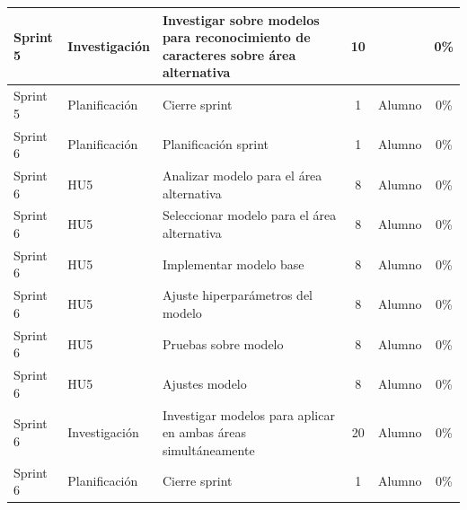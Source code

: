 \documentclass[
11pt, %
]{charter}
\begin{document}
\begin{table}[htpb]
\begin{tabularx}{\linewidth}{@{}|l|l|X|c|l|c|@{}}
Sprint 5	&	Investigación	&	Investigar sobre modelos para reconocimiento de caracteres sobre área alternativa	&	10	&		&	0\%	\\ \hline
Sprint 5	&	Planificación	&	Cierre sprint	&	1	&	Alumno	&	0\%	\\ \hline
Sprint 6	&	Planificación	&	Planificación sprint	&	1	&	Alumno	&	0\%	\\ \hline
Sprint 6	&	HU5	&	Analizar modelo para el área alternativa	&	8	&	Alumno	&	0\%	\\ \hline
Sprint 6	&	HU5	&	Seleccionar modelo para el área alternativa	&	8	&	Alumno	&	0\%	\\ \hline
Sprint 6	&	HU5	&	Implementar modelo base	&	8	&	Alumno	&	0\%	\\ \hline
Sprint 6	&	HU5	&	Ajuste hiperparámetros del modelo	&	8	&	Alumno	&	0\%	\\ \hline
Sprint 6	&	HU5	&	Pruebas sobre modelo	&	8	&	Alumno	&	0\%	\\ \hline
Sprint 6	&	HU5	&	Ajustes modelo	&	8	&	Alumno	&	0\%	\\ \hline
Sprint 6	&	Investigación	&	Investigar modelos  para aplicar en ambas áreas simultáneamente	&	20	&	Alumno	&	0\%	\\ \hline
Sprint 6	&	Planificación	&	Cierre sprint	&	1	&	Alumno	&	0\%	\\ \hline

\end{tabularx}
\end{table}
\end{document}
